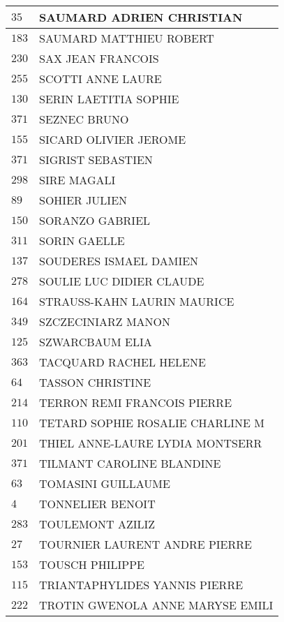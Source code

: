 \begin{xltabular}{\linewidth}{|l|X|}
    \hline
    $35$ & SAUMARD ADRIEN CHRISTIAN \\
    \hline
    $183$ & SAUMARD MATTHIEU ROBERT \\
    \hline
    $230$ & SAX JEAN FRANCOIS \\
    \hline
    $255$ & SCOTTI ANNE LAURE \\
    \hline
    $130$ & SERIN LAETITIA SOPHIE \\
    \hline
    $371$ & SEZNEC BRUNO \\
    \hline
    $155$ & SICARD OLIVIER JEROME \\
    \hline
    $371$ & SIGRIST SEBASTIEN \\
    \hline
    $298$ & SIRE MAGALI \\
    \hline
    $89$ & SOHIER JULIEN \\
    \hline
    $150$ & SORANZO GABRIEL \\
    \hline
    $311$ & SORIN GAELLE \\
    \hline
    $137$ & SOUDERES ISMAEL DAMIEN \\
    \hline
    $278$ & SOULIE LUC DIDIER CLAUDE \\
    \hline
    $164$ & STRAUSS-KAHN LAURIN MAURICE \\
    \hline
    $349$ & SZCZECINIARZ MANON \\
    \hline
    $125$ & SZWARCBAUM ELIA \\
    \hline
    $363$ & TACQUARD RACHEL HELENE \\
    \hline
    $64$ & TASSON CHRISTINE \\
    \hline
    $214$ & TERRON REMI FRANCOIS PIERRE \\
    \hline
    $110$ & TETARD SOPHIE ROSALIE CHARLINE M \\
    \hline
    $201$ & THIEL ANNE-LAURE LYDIA MONTSERR \\
    \hline
    $371$ & TILMANT CAROLINE BLANDINE \\
    \hline
    $63$ & TOMASINI GUILLAUME \\
    \hline
    $4$ & TONNELIER BENOIT \\
    \hline
    $283$ & TOULEMONT AZILIZ \\
    \hline
    $27$ & TOURNIER LAURENT ANDRE PIERRE \\
    \hline
    $153$ & TOUSCH PHILIPPE \\
    \hline
    $115$ & TRIANTAPHYLIDES YANNIS PIERRE \\
    \hline
    $222$ & TROTIN GWENOLA ANNE MARYSE EMILI \\

\end{xltabular}
